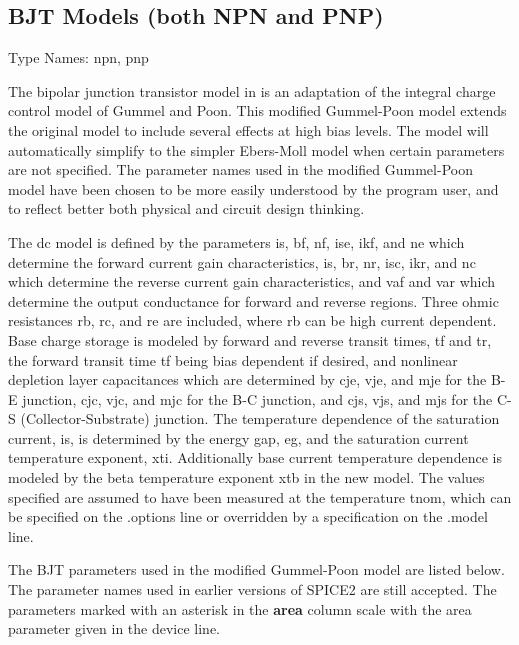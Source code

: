\subsection{BJT Models (both NPN and PNP)}
\label{bjtmodel}


{\cb Type Names:} {\vt npn}, {\vt pnp}

The bipolar junction transistor model in {\WRspice} is an adaptation of
the integral charge control model of Gummel and Poon.  This modified
Gummel-Poon model extends the original model to include several
effects at high bias levels.  The model will automatically simplify to
the simpler Ebers-Moll model when certain parameters are not
specified.  The parameter names used in the modified Gummel-Poon model
have been chosen to be more easily understood by the program user, and
to reflect better both physical and circuit design thinking.

The dc model is defined by the parameters {\vt is}, {\vt bf}, {\vt
nf}, {\vt ise}, {\vt ikf}, and {\vt ne} which determine the forward
current gain characteristics, {\vt is}, {\vt br}, {\vt nr}, {\vt isc},
{\vt ikr}, and {\vt nc} which determine the reverse current gain
characteristics, and {\vt vaf} and {\vt var} which determine the
output conductance for forward and reverse regions.  Three ohmic
resistances {\vt rb}, {\vt rc}, and {\vt re} are included, where {\vt
rb} can be high current dependent.  Base charge storage is modeled by
forward and reverse transit times, {\vt tf} and {\vt tr}, the forward
transit time {\vt tf} being bias dependent if desired, and nonlinear
depletion layer capacitances which are determined by {\vt cje}, {\vt
vje}, and {\vt mje} for the B-E junction, {\vt cjc}, {\vt vjc}, and
{\vt mjc} for the B-C junction, and {\vt cjs}, {\vt vjs}, and {\vt
mjs} for the C-S (Collector-Substrate) junction.  The temperature
dependence of the saturation current, {\vt is}, is determined by the
energy gap, {\vt eg}, and the saturation current temperature exponent,
{\vt xti}.  Additionally base current temperature dependence is
modeled by the beta temperature exponent {\vt xtb} in the new model.
The values specified are assumed to have been measured at the
temperature {\vt tnom}, which can be specified on the {\vt .options}
line or overridden by a specification on the {\vt .model} line.

The BJT parameters used in the modified Gummel-Poon model are listed
below.  The parameter names used in earlier versions of SPICE2 are
still accepted.  The parameters marked with an asterisk in the {\bf
area} column scale with the {\vt area} parameter given in the device
line.

